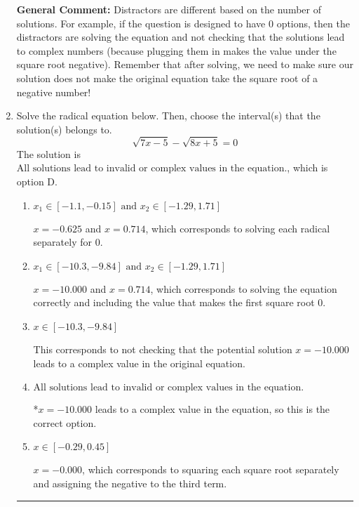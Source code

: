 \documentclass{extbook}[14pt]
\newcommand{\litem}[1]{\item #1

\rule{\textwidth}{0.4pt}}
\begin{document}
\begin{enumerate}
{\textbf{General Comment:} Distractors are different based on the number of solutions. For example, if the question is designed to have 0 options, then the distractors are solving the equation and not checking that the solutions lead to complex numbers (because plugging them in makes the value under the square root negative). Remember that after solving, we need to make sure our solution does not make the original equation take the square root of a negative number!
}
\litem{
Solve the radical equation below. Then, choose the interval(s) that the solution(s) belongs to.
\[ \sqrt{7 x - 5} - \sqrt{8 x + 5} = 0 \]The solution is \( \text{All solutions lead to invalid or complex values in the equation.} \), which is option D.\begin{enumerate}[label=\Alph*.]
\item \( x_1 \in [-1.1, -0.15] \text{ and } x_2 \in [-1.29,1.71] \)

$x = -0.625$ and $x = 0.714$, which corresponds to solving each radical separately for 0.
\item \( x_1 \in [-10.3, -9.84] \text{ and } x_2 \in [-1.29,1.71] \)

$x = -10.000$ and $x = 0.714$, which corresponds to solving the equation correctly and including the value that makes the first square root 0.
\item \( x \in [-10.3,-9.84] \)

This corresponds to not checking that the potential solution $x = -10.000$ leads to a complex value in the original equation.
\item \( \text{All solutions lead to invalid or complex values in the equation.} \)

*$x = -10.000$ leads to a complex value in the equation, so this is the correct option.
\item \( x \in [-0.29,0.45] \)

$x = -0.000$, which corresponds to squaring each square root separately and assigning the negative to the third term.
\end{enumerate}

}
\end{enumerate}
\end{document}

